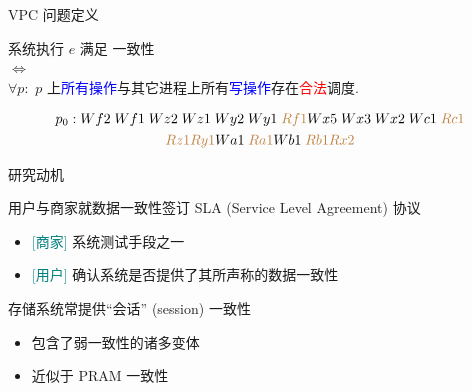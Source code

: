 \begin{frame}{VPC 问题定义}
  \begin{cdef}
	\begin{center}
	  系统执行 $e$ 满足 \PRAM{} 一致性 \\
	  $\iff$\\
	  $\forall p:$ $p$ 上\textcolor{blue}{所有操作}与其它进程上所有\textcolor{blue}{写操作}存在\textcolor{red}{合法}调度.
	\end{center}
  \end{cdef}


  \pause
  \vspace{-0.80cm}

  \begin{gather*}
	p_{0}: Wf2\; Wf1\; Wz2\; Wz1\; Wy2\; Wy1\; \textcolor{brown}{Rf1} 
	Wx5\; Wx3\; Wx2\; Wc1\; \textcolor{brown}{Rc1} \\
	\textcolor{brown}{Rz1} \textcolor{brown}{Ry1}
	Wa1\; \textcolor{brown}{Ra1} Wb1\; \textcolor{brown}{Rb1} \textcolor{brown}{Rx2}
  \end{gather*}
\end{frame}
\begin{frame}{研究动机}
  \vspace{0.10cm}

  \begin{description}
    \setlength{\itemsep}{10pt}
	\item[验证:] 用户与商家就数据一致性签订 SLA {\small (Service Level Agreement)} 协议
	   
	  \vspace{2pt}
	  \begin{itemize}
		\item \textcolor{teal}{[商家]} 系统测试手段之一
		\item \textcolor{teal}{[用户]} 确认系统是否提供了其所声称的数据一致性 
	  \end{itemize}
	\pause
	\item[PRAM:] 存储系统常提供``会话'' {\small (session)} 一致性\\
       
	  \vspace{2pt}
      \begin{itemize}
		\item 包含了弱一致性的诸多变体 
		\item 近似于 PRAM 一致性  
      \end{itemize}
  \end{description}
\end{frame}

